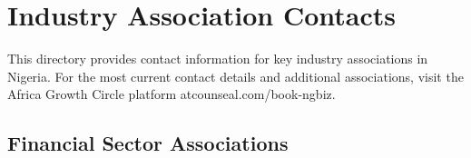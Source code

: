 
\chapter{Industry Association Contacts}\label{ch:industry-associations}

\begin{importantbox}
This directory provides contact information for key industry associations in Nigeria. For the most current contact details and additional associations, visit the Africa Growth Circle platform atcounseal.com/book-ngbiz.
\end{importantbox}

\vspace{2em}

\section{Financial Sector Associations}\label{sec:financial-associations}
\vspace{1em}

